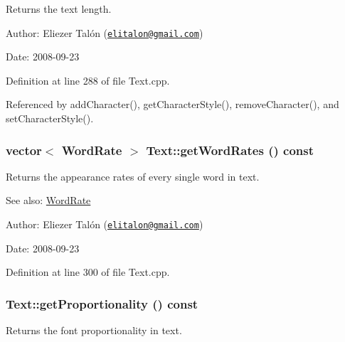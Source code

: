 Returns the text length. 

\begin{Desc}
\item[Author:]Eliezer Talón (\href{mailto:elitalon@gmail.com}{\tt elitalon@gmail.com}) \end{Desc}
\begin{Desc}
\item[Date:]2008-09-23 \end{Desc}


Definition at line 288 of file Text.cpp.

Referenced by addCharacter(), getCharacterStyle(), removeCharacter(), and setCharacterStyle().\hypertarget{class_text_2fd83be91d5ba2c24fd44df45efc92c9}{
\subsubsection[getWordRates]{\setlength{\rightskip}{0pt plus 5cm}vector$<$ {\bf WordRate} $>$ Text::getWordRates () const}}
\label{class_text_2fd83be91d5ba2c24fd44df45efc92c9}


Returns the appearance rates of every single word in text. 

\begin{Desc}
\item[See also:]\hyperlink{_word_rate_8h_e8f43926daba5798edbb3cb94ad07ff7}{WordRate}\end{Desc}
\begin{Desc}
\item[Author:]Eliezer Talón (\href{mailto:elitalon@gmail.com}{\tt elitalon@gmail.com}) \end{Desc}
\begin{Desc}
\item[Date:]2008-09-23 \end{Desc}


Definition at line 300 of file Text.cpp.\hypertarget{class_text_fa8149d9658fd279eb2f6c6c967b3bb5}{
\subsubsection[getProportionality]{ Text::getProportionality () const}}
\label{class_text_fa8149d9658fd279eb2f6c6c967b3bb5}


Returns the font proportionality in text. 

